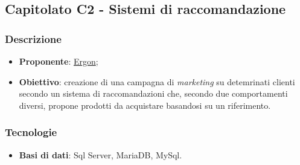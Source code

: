 \subsection{Capitolato C2 - Sistemi di raccomandazione}


\subsubsection{Descrizione}
\begin{itemize}
    \item \textbf{Proponente}: \href{https://www.ergon.it/}{Ergon};
    \item \textbf{Obiettivo}: creazione di una campagna di \textit{marketing} su detemrinati clienti secondo un sistema di raccomandazioni che, secondo due comportamenti diversi, propone prodotti da acquistare basandosi su un riferimento.
\end{itemize}


\subsubsection{Tecnologie}
\begin{itemize}
    \item \textbf{Basi di dati}: Sql Server, MariaDB, MySql.
\end{itemize}


